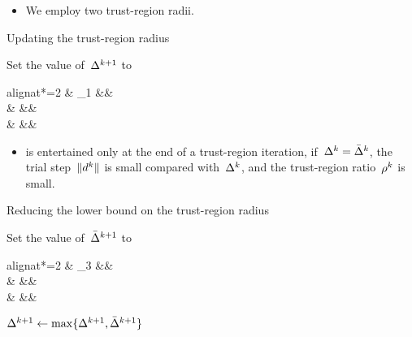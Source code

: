 \begin{itemize}
    \item We employ two trust-region radii.
\end{itemize}

\begin{algorithm}[ht]
    \caption{Updating the trust-region radius}
    \DontPrintSemicolon
    Set the value of~$\rad[k + 1]$ to
    \begin{algoempheq}[left={\rad[k + 1] \gets \empheqlbrace}]{alignat*=2}
        & \theta_1 \rad[k]                                                                      && \quad {}\\
        & \min {}                                               && \quad {}\\
        & \min {}    && \quad {}
    \end{algoempheq}
    \If{$\rad[k + 1] \le \eta_3 \radlb[k]$}{
        $\rad[k + 1] \gets \radlb[k]$\;
    }
\end{algorithm}

\begin{itemize}
    \item {} is entertained only at the end of a trust-region iteration, if~$\rad[k] = \radlb[k]$, the trial step~$\norm{\step[k]}$ is small compared with~$\rad[k]$, and the trust-region ratio~$\ratio[k]$ is small.
\end{itemize}

\begin{algorithm}[ht]
    \caption{Reducing the lower bound on the trust-region radius}
    \label{alg:reducing-lower-bound-trust-region-radius}
    \DontPrintSemicolon
    Set the value of~$\radlb[k + 1]$ to
    \begin{algoempheq}[left={\radlb[k + 1] \gets \empheqlbrace}]{alignat*=2}
        & \theta_3 \radlb[k]                && \quad {}\\
        & \sqrt{\radlb[k] \radlb[\infty]}   && \quad {}\\
        & \radlb[\infty]                    && \quad {}
    \end{algoempheq}
    $\rad[k + 1] \gets \max \set{\rad[k + 1], \radlb[k + 1]}$\;
\end{algorithm}

